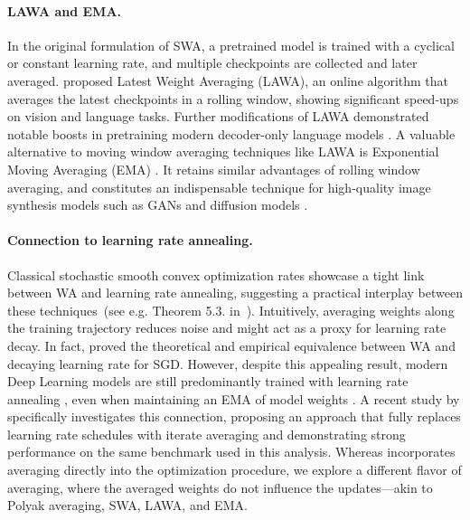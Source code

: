 \paragraph{LAWA and EMA.} In the original formulation of SWA, a pretrained model is trained with a cyclical or constant learning rate, and multiple checkpoints are collected and later averaged.
\citet{kaddour_stop_2022} proposed Latest Weight Averaging (LAWA), an online algorithm that averages the latest checkpoints in a rolling window, showing significant speed-ups on vision and language tasks. Further modifications of LAWA demonstrated notable boosts in pretraining modern decoder-only language models \citep{sanyal_early_2023}. %
A valuable alternative to moving window averaging techniques like LAWA is Exponential Moving Averaging (EMA) \citep{li_switch_2024, morales_ema}. It retains similar advantages of rolling window averaging, and constitutes an indispensable technique for high-quality image synthesis models such as GANs and diffusion models \citep{yazıcı2019avg_gan, song2021score_based_gen, karras2024nvidia_diffusion_avg}.

\vspace{-2mm}
\paragraph{Connection to learning rate annealing.} 
Classical stochastic smooth convex optimization rates showcase a tight link between WA and learning rate annealing, suggesting a practical interplay between these techniques~(see e.g. Theorem 5.3. in~\citet{garrigos2023handbook}).
Intuitively, averaging weights along the training trajectory reduces noise and might act as a proxy for learning rate decay. In fact, \citet{sandler_training_2023} proved the theoretical and empirical equivalence between WA and decaying learning rate for SGD. 
However, despite this appealing result, 
modern Deep Learning models are still predominantly trained with learning rate annealing \citep{hagele2024scaling}, even when maintaining an EMA of model weights \citep{DeepSeekV3}. 
A recent study by \citet{defazio_road_2024} specifically investigates this connection, proposing an approach that fully replaces learning rate schedules with iterate averaging and demonstrating strong performance on the same benchmark used in this analysis.
Whereas \citet{defazio_road_2024} incorporates averaging directly into the optimization procedure, we explore a different flavor of averaging, where the averaged weights do not influence the updates—akin to Polyak averaging, SWA, LAWA, and EMA.

